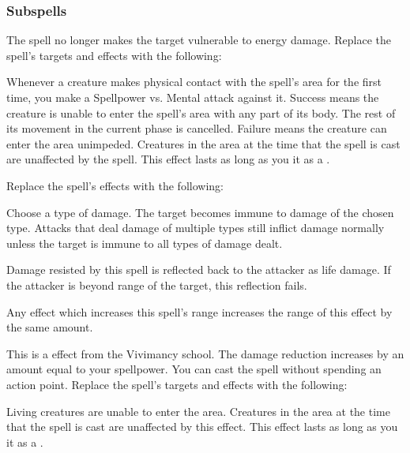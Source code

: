 \subsubsection{Subspells}
The spell no longer makes the target vulnerable to energy damage.
Replace the spell's targets and effects with the following:
\begin{spellcontent}
\begin{augmenttargetinginfo}
\end{augmenttargetinginfo}
\begin{augmenteffects}
\spelleffect
Whenever a creature makes physical contact with the spell's area for the first time, you make a Spellpower vs. Mental attack against it.
Success means the creature is unable to enter the spell's area with any part of its body.
The rest of its movement in the current phase is cancelled.
Failure means the creature can enter the area unimpeded.
Creatures in the area at the time that the spell is cast are unaffected by the spell.
This effect lasts as long as you  it as a .
\end{augmenteffects}
\end{spellcontent}
Replace the spell's effects with the following:
\begin{spellcontent}
\begin{augmenteffects}
\spelleffect
Choose a type of damage.
The target becomes immune to damage of the chosen type.
Attacks that deal damage of multiple types still inflict damage normally unless the target is immune to all types of damage dealt.
\end{augmenteffects}
\end{spellcontent}
Damage resisted by this spell is reflected back to the attacker as life damage.
If the attacker is beyond \rngclose range of the target, this reflection fails.
\par Any effect which increases this spell's range increases the range of this effect by the same amount.
\par
This is a  effect from the Vivimancy school.
The damage reduction increases by an amount equal to your spellpower.
You can cast the spell without spending an action point.
Replace the spell's targets and effects with the following:
\begin{spellcontent}
\begin{augmenttargetinginfo}
\end{augmenttargetinginfo}
\begin{augmenteffects}
\spelleffect
Living creatures are unable to enter the area.
Creatures in the area at the time that the spell is cast are unaffected by this effect.
This effect lasts as long as you  it as a .
\end{augmenteffects}
\end{spellcontent}
